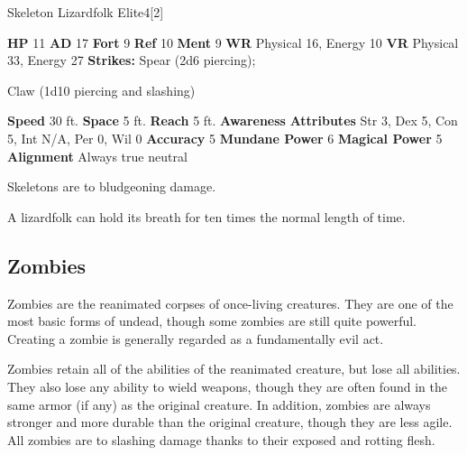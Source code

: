   \begin{monsubsection}{Skeleton Lizardfolk Elite}{4}[2]
    \vspace{-1em}\vspace{-1em}
    \vspace{0em}

    
    

    \begin{spellcontent}
      \begin{spelltargetinginfo}
        \pari \textbf{HP} 11 \monsep
          \textbf{AD} 17 \monsep
          \textbf{Fort} 9 \monsep
          \textbf{Ref} 10 \monsep
          \textbf{Ment} 9
        \pari \textbf{WR} Physical 16, Energy 10 \monsep
        \textbf{VR} Physical 33, Energy 27
        \pari \textbf{Strikes:}
            Spear  (2d6 piercing);
\par Claw  (1d10 piercing and slashing)
      \end{spelltargetinginfo}
    \end{spellcontent}
    \begin{monsterfooter}
      \pari \textbf{Speed} 30 ft. \monsep
        \textbf{Space} 5 ft. \monsep
        \textbf{Reach} 5 ft.
      \pari \textbf{Awareness} 
      \pari \textbf{Attributes}
        Str 3, Dex 5,
        Con 5, Int N/A,
        Per 0, Wil 0
      \pari \textbf{Accuracy} 5 \monsep
        \textbf{Mundane Power} 6 \monsep
      \textbf{Magical Power} 5
      \pari \textbf{Alignment} Always true neutral
    \end{monsterfooter}
  \end{monsubsection}
          Skeletons are  to bludgeoning damage.
        
     A lizardfolk can hold its breath for ten times the normal length of time.
  
  
    \subsection{Zombies}
      
      Zombies are the reanimated corpses of once-living creatures.
      They are one of the most basic forms of undead, though some zombies are still quite powerful.
      Creating a zombie is generally regarded as a fundamentally evil act.
    
      Zombies retain all of the  abilities of the reanimated creature, but lose all  abilities.
      They also lose any ability to wield weapons, though they are often found in the same armor (if any) as the original creature.
      In addition, zombies are always stronger and more durable than the original creature, though they are less agile.
      All zombies are  to slashing damage thanks to their exposed and rotting flesh.
    

